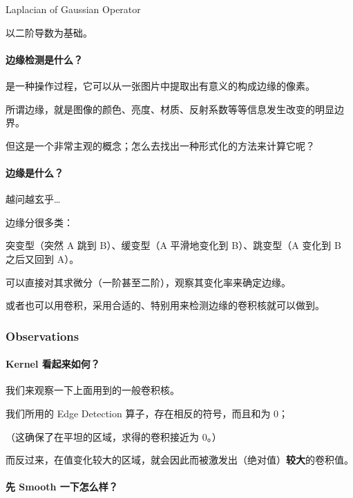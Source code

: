 \documentclass[
]{article}
\begin{document}
Laplacian of Gaussian Operator

以二阶导数为基础。

\hypertarget{header-n77}{%
\paragraph{边缘检测是什么？}\label{header-n77}}

是一种操作过程，它可以从一张图片中提取出有意义的构成边缘的像素。

所谓边缘，就是图像的颜色、亮度、材质、反射系数等等信息发生改变的明显边界。

但这是一个非常主观的概念；怎么去找出一种形式化的方法来计算它呢？

\hypertarget{header-n81}{%
\paragraph{边缘是什么？}\label{header-n81}}

越问越玄乎\ldots{}

边缘分很多类：

突变型（突然 A 跳到 B）、缓变型（A 平滑地变化到 B）、跳变型（A 变化到 B
之后又回到 A）。

可以直接对其求微分（一阶甚至二阶），观察其变化率来确定边缘。

或者也可以用卷积，采用合适的、特别用来检测边缘的卷积核就可以做到。

\hypertarget{header-n87}{%
\subsubsection{Observations}\label{header-n87}}

\hypertarget{header-n88}{%
\paragraph{Kernel 看起来如何？}\label{header-n88}}

我们来观察一下上面用到的一般卷积核。

我们所用的 Edge Detection 算子，存在相反的符号，而且和为 0；

（这确保了在平坦的区域，求得的卷积接近为 0。）

而反过来，在值变化较大的区域，就会因此而被激发出（绝对值）\textbf{较大}的卷积值。

\hypertarget{header-n93}{%
\paragraph{先 Smooth 一下怎么样？}\label{header-n93}}
\end{document}
